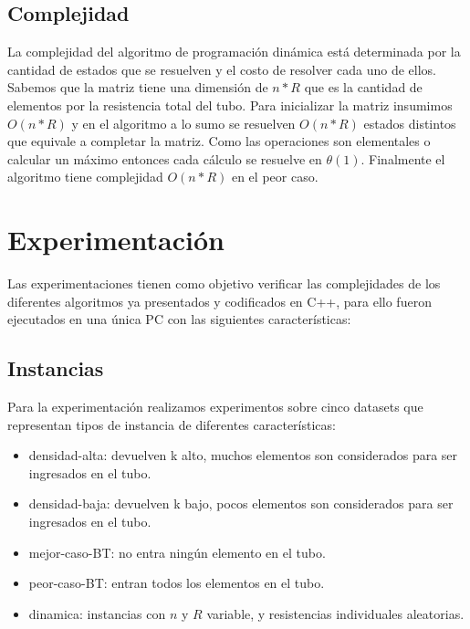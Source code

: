 \documentclass[10pt,a4paper]{article}
\begin{document}
\subsection{Complejidad}
La complejidad del algoritmo de programación dinámica está determinada por la cantidad de estados que se resuelven y el costo de resolver cada uno de ellos.
Sabemos que la matriz tiene una dimensión de $n * R$ que es la cantidad de elementos por la resistencia total del tubo. Para inicializar la matriz insumimos $O(n * R)$ y en el algoritmo a lo sumo se resuelven $O(n * R)$ estados distintos que equivale a completar la matriz. Como las operaciones son elementales o calcular un máximo entonces cada cálculo se resuelve en $\theta(1)$. Finalmente el algoritmo tiene complejidad $O(n * R)$ en el peor caso.

\section{Experimentación} \label{sec:experimentacion}
Las experimentaciones tienen como objetivo verificar las complejidades de los diferentes algoritmos ya presentados y codificados en C++, para ello fueron ejecutados en una única PC con las siguientes características:

\subsection{Instancias} \label{instancias}
Para la experimentación realizamos experimentos sobre cinco datasets que representan tipos de instancia de diferentes características:
\begin{itemize}
	\item densidad-alta: devuelven k alto, muchos elementos son considerados para ser ingresados en el tubo.
	\item densidad-baja: devuelven k bajo, pocos elementos son considerados para ser ingresados en el tubo.
	\item mejor-caso-BT: no entra ningún elemento en el tubo.
	\item peor-caso-BT: entran todos los elementos en el tubo.
	\item dinamica: instancias con $n$ y $R$ variable, y resistencias individuales aleatorias.
\end{itemize}
\end{document}
